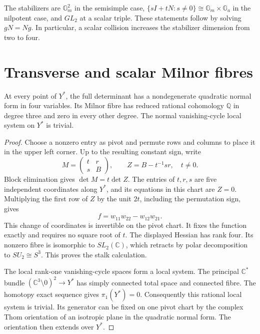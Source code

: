 The stabilizers are $\mathbb G_m^2$ in the semisimple case,
$\{sI+tN:s\ne0\}\cong\mathbb G_m\times\mathbb G_a$ in the
nilpotent case, and $GL_2$ at a scalar triple. These statements follow
by solving $gN=Ng$. In particular, a scalar collision increases the
stabilizer dimension from two to four.

\section{Transverse and scalar Milnor fibres}
\label{sec:c3-collision-stalks}

\begin{lemma}
\label{lem:c3-collision-morse}
At every point of $Y^*$, the full determinant has a nondegenerate
quadratic normal form in four variables. Its Milnor fibre has reduced
rational cohomology $\mathbb Q$ in degree three and zero in every
other degree. The normal vanishing-cycle local system on $Y^*$ is
trivial.
\end{lemma}

\begin{proof}
Choose a nonzero entry as pivot and permute rows and columns to
place it in the upper left corner. Up to the resulting constant
sign, write
\[
 M=\begin{pmatrix}t&r\\s&B\end{pmatrix},\qquad
 Z=B-t^{-1}sr,
 \quad t\ne0.
\]
Block elimination gives $\det M=t\det Z$. The entries of $t,r,s$
are five independent coordinates along $Y^*$, and its equations in
this chart are $Z=0$. Multiplying the first row of $Z$ by the unit
$2t$, including the permutation sign, gives
\[
 f=w_{11}w_{22}-w_{12}w_{21}.
\]
This change of coordinates is invertible on the pivot chart.
It fixes the function exactly and requires no square root of $t$.
The displayed Hessian has rank four. Its nonzero fibre is isomorphic
to $SL_2(\mathbb C)$, which retracts by polar decomposition to
$SU_2\cong S^3$. This proves the stalk calculation.

The local rank-one vanishing-cycle spaces form a local system.
The principal $\mathbb C^*$ bundle
$(\mathbb C^3\setminus0)^2\to Y^*$ has simply connected total
space and connected fibre. The homotopy exact sequence gives
$\pi_1(Y^*)=0$. Consequently this rational local system is trivial.
Its generator can be fixed on one pivot chart by the complex Thom
orientation of an isotropic plane in the quadratic normal form.
The orientation then extends over $Y^*$.
\end{proof}

